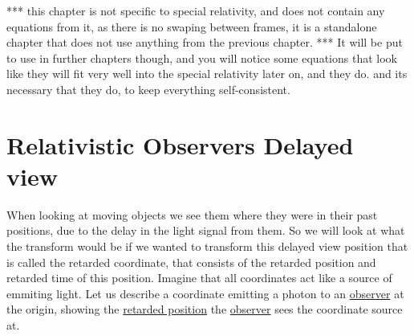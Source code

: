 *** this chapter is not specific to special relativity, and does not contain any equations from it, as there is no swaping between frames, it is a standalone chapter that does not use anything from the previous chapter.
*** It will be put to use in further chapters though, and you will notice some equations that look like they will fit very well into the special relativity later on, and they do. and its necessary that they do, to keep everything self-consistent.

\section{Relativistic Observers Delayed view} \label{sect: Relativistic Observers Delayed view}

When looking at moving objects we see them where they were in their past positions, due to the delay in the light signal from them.
So we will look at what the transform would be if we wanted to transform this delayed view position that is called the retarded coordinate, that consists of the retarded position and retarded time of this position.
Imagine that all coordinates act like a source of emmiting light.
Let us describe a coordinate emitting a photon to an \hyperlink{def-observer}{observer} at the origin, showing the \hyperlink{def-retarded-position}{retarded position} the \hyperlink{def-observer}{observer} sees the coordinate source at.

